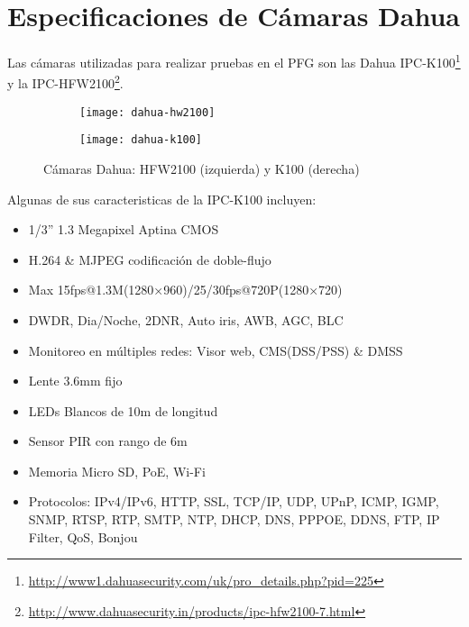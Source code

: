 \newpage
\appendix
\chapter{Especificaciones de Cámaras Dahua}
\label{appendix:dahua}
Las cámaras utilizadas para realizar pruebas en el PFG son las Dahua IPC-K100\footnote{\url{http://www1.dahuasecurity.com/uk/pro_details.php?pid=225}} y la IPC-HFW2100\footnote{\url{http://www.dahuasecurity.in/products/ipc-hfw2100-7.html}}.
    
\begin{figure}[h]
\begin{subfigure}{0.6\textwidth}
\texttt{[image: dahua-hw2100]}
\end{subfigure}
\begin{subfigure}{0.4\textwidth}
\texttt{[image: dahua-k100]}
\end{subfigure}


\caption{Cámaras Dahua: HFW2100 (izquierda) y K100 (derecha) \protect\cite{dahua2016-iu}}
\label{fig:dahua-cam}
\end{figure}


Algunas de sus caracteristicas de la IPC-K100 incluyen:
\begin{itemize}
\item 1/3” 1.3 Megapixel Aptina CMOS
\item H.264 \& MJPEG codificación de doble-flujo
\item Max 15fps@1.3M(1280×960)/25/30fps@720P(1280×720)
\item DWDR, Dia/Noche, 2DNR, Auto iris, AWB, AGC, BLC
\item Monitoreo en múltiples redes: Visor web, CMS(DSS/PSS) \& DMSS
\item Lente 3.6mm fijo
\item LEDs Blancos de 10m de longitud 
\item Sensor PIR con rango de 6m
\item Memoria Micro SD, PoE, Wi-Fi 
\item Protocolos: IPv4/IPv6, HTTP, SSL, TCP/IP, UDP, UPnP, ICMP, IGMP, SNMP, RTSP, RTP, SMTP, NTP, DHCP, DNS, PPPOE, DDNS, FTP,  IP Filter,  QoS, Bonjou
\end{itemize}



